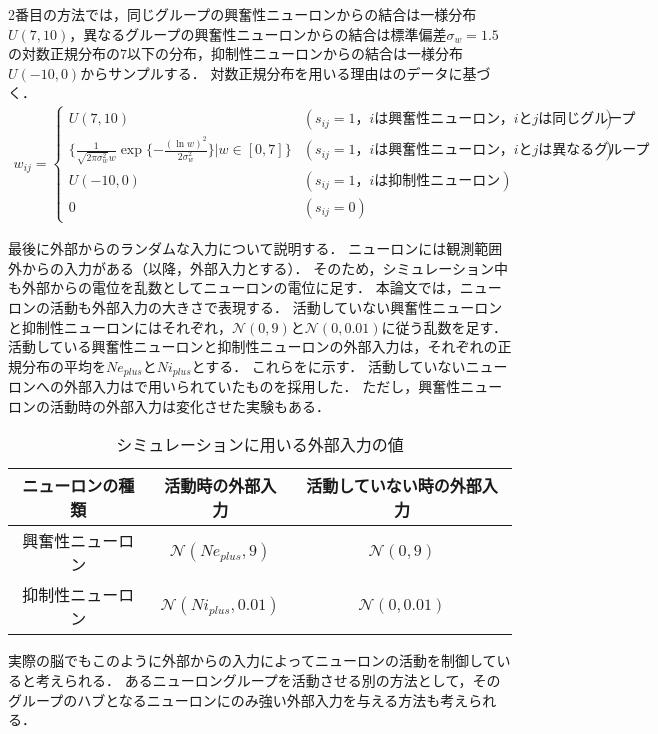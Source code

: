 2番目の方法では，同じグループの興奮性ニューロンからの結合は一様分布$U(7,10)$，異なるグループの興奮性ニューロンからの結合は標準偏差$\sigma_w = 1.5$の対数正規分布の$7$以下の分布，抑制性ニューロンからの結合は一様分布$U(-10,0)$からサンプルする．
対数正規分布を用いる理由は\cite{Song}のデータに基づく．
\begin{align}
	w_{ij} = \begin{cases}
		U(7,10) & (s_{ij} = 1 \text{，$i$は興奮性ニューロン，$i$と$j$は同じグループ}) \\
		\{\frac{1}{\sqrt{2 \pi \sigma_w^2}w} \exp \{ - \frac{(\ln w)^2}{2 \sigma_w^2} \} | w \in [0,7]\} & (s_{ij} = 1 \text{，$i$は興奮性ニューロン，$i$と$j$は異なるグループ}) \\
		U(-10,0) & (s_{ij} = 1 \text{，$i$は抑制性ニューロン}) \\
		0 & (s_{ij} = 0)
  \end{cases}
	\label{eq:W}
\end{align}

最後に外部からのランダムな入力について説明する．
ニューロンには観測範囲外からの入力がある（以降，外部入力とする）．
そのため，シミュレーション中も外部からの電位を乱数としてニューロンの電位に足す．
本論文では，ニューロンの活動も外部入力の大きさで表現する．
活動していない興奮性ニューロンと抑制性ニューロンにはそれぞれ，$\mathcal{N}(0,9)$と$\mathcal{N}(0,0.01)$に従う乱数を足す．
活動している興奮性ニューロンと抑制性ニューロンの外部入力は，それぞれの正規分布の平均を$Ne_{plus}$と$Ni_{plus}$とする．
これらをに示す．
活動していないニューロンへの外部入力は\cite{Izhikevich2003}で用いられていたものを採用した．
ただし，興奮性ニューロンの活動時の外部入力は変化させた実験もある．

\begin{table}[htb]
  \center
  \begin{tabular}{|c|cc|} \hline
    ニューロンの種類 & 活動時の外部入力 & 活動していない時の外部入力 \\ \hline
		興奮性ニューロン & $\mathcal{N}(Ne_{plus},9)$ & $\mathcal{N}(0, 9)$ \\
		抑制性ニューロン & $\mathcal{N}(Ni_{plus}, 0.01)$ & $\mathcal{N}(0, 0.01)$ \\ \hline
  \end{tabular}
  \caption{シミュレーションに用いる外部入力の値}
  \label{tab:parameter3}
\end{table}

実際の脳でもこのように外部からの入力によってニューロンの活動を制御していると考えられる．
あるニューロングループを活動させる別の方法として，そのグループのハブとなるニューロンにのみ強い外部入力を与える方法も考えられる．

